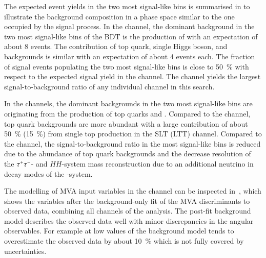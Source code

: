 The expected event yields in the two most signal-like bins is summarised in
 to illustrate the background
composition in a phase space similar to the one occupied by the signal process.
In the \hadhad channel, the dominant background in the two most signal-like bins
of the BDT is the production of \ZHF with an expectation of about 8 events. The
contribution of top quark, single Higgs boson, and \faketauhadvis backgrounds is
similar with an expectation of about 4 events each. The fraction of signal
events populating the two most signal-like bins is close to \SI{50}{\percent}
with respect to the expected signal yield in the channel. The \hadhad channel
yields the largest signal-to-background ratio of any individual channel in this
search.

In the \lephad channels, the dominant backgrounds in the two most signal-like
bins are originating from the production of top quarks and \ZHF. Compared to the
\hadhad channel, top quark backgrounds are more abundant
with a large contribution of about \SI{50}{\percent} (\SI{15}{\percent}) from
single top production in the SLT (LTT) channel. Compared to the \hadhad channel,
the signal-to-background ratio in the most signal-like bins is reduced due to
the abundance of top quark backgrounds and the decrease resolution of the
$\tau^{+} \tau^{-}$- and $HH$-system mass reconstruction due to an additional neutrino in
\lephad decay modes of the \tautau-system.


The modelling of MVA input variables in the \hadhad channel can be inspected
in~, which shows the variables after the
background-only fit of the MVA discriminants to observed data, combining all
channels of the analysis. The post-fit background model describes the observed
data well with minor discrepancies in the angular observables. For example at
low values of \dRtautau the background model tends to overestimate the observed
data by about \SI{10}{\percent} which is not fully covered by uncertainties.

